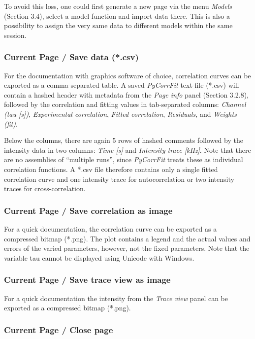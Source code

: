 To avoid this loss, one could first generate a new page via the menu \textit{Models} (Section 3.4), select a model function and import data there. This is also a possibility to assign the very same data to different models within the same session.

\subsubsection{Current Page / Save data (*.csv)}

For the documentation with graphics software of choice, correlation curves can be exported as a comma-separated table. A saved \textit{PyCorrFit} text-file (*.csv) will contain a hashed header with metadata from the \textit{Page info} panel (Section 3.2.8), followed by the correlation and fitting values in tab-separated columns: \textit{Channel (tau [s])}, \textit{Experimental correlation}, \textit{Fitted correlation}, \textit{Residuals, }and \textit{Weights (fit)}. 

Below the columns, there are again 5 rows of hashed comments followed by the intensity data in two columns: \textit{Time [s]} and \textit{Intensity trace [kHz]}. Note that there are no assemblies of “multiple runs”, since \textit{PyCorrFit} treats these as individual correlation functions. A *.csv file therefore contains only a single fitted correlation curve and one intensity trace for autocorrelation or two intensity traces for cross-correlation.

\subsubsection{Current Page / Save correlation as image}

For a quick documentation, the correlation curve can be exported as a compressed bitmap (*.png). The plot contains a legend and the actual values and errors of the varied parameters, however, not the fixed parameters. Note that the variable tau cannot be displayed using Unicode with Windows.

\subsubsection{Current Page / Save trace view as image}

For a quick documentation the intensity from the \textit{Trace view} panel can be exported as a compressed bitmap (*.png). 

\subsubsection{Current Page / Close page}

